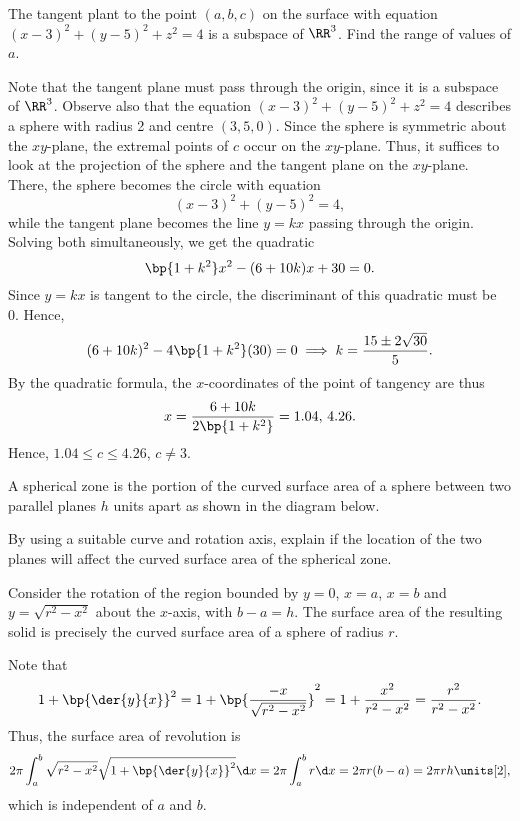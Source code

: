 \begin{problem}
    The tangent plant to the point $(a, b, c)$ on the surface with equation $(x-3)^2 + (y-5)^2 + z^2 = 4$ is a subspace of $\RR^3$. Find the range of values of $a$.
\end{problem}
\begin{solution}
    Note that the tangent plane must pass through the origin, since it is a subspace of $\RR^3$. Observe also that the equation $(x-3)^2 + (y-5)^2 + z^2 = 4$ describes a sphere with radius 2 and centre $(3, 5, 0)$. Since the sphere is symmetric about the $xy$-plane, the extremal points of $c$ occur on the $xy$-plane. Thus, it suffices to look at the projection of the sphere and the tangent plane on the $xy$-plane. There, the sphere becomes the circle with equation \[(x-3)^2 + (y-5)^2 = 4,\] while the tangent plane becomes the line $y = kx$ passing through the origin. Solving both simultaneously, we get the quadratic \[\bp{1 + k^2} x^2 - (6 + 10k)x + 30 = 0.\] Since $y = kx$ is tangent to the circle, the discriminant of this quadratic must be 0. Hence, \[(6 + 10k)^2 - 4\bp{1 + k^2}(30) = 0 \implies k = \frac{15 \pm 2\sqrt{30}}{5}.\] By the quadratic formula, the $x$-coordinates of the point of tangency are thus \[x = \frac{6+10k}{2\bp{1 + k^2}} = 1.04, \, 4.26.\] Hence, $1.04 \leq c \leq 4.26$, $c \neq 3$.
\end{solution}

\clearpage
\begin{problem}
    A spherical zone is the portion of the curved surface area of a sphere between two parallel planes $h$ units apart as shown in the diagram below.

    \begin{figure}[H]
        \centering
    \end{figure}

    By using a suitable curve and rotation axis, explain if the location of the two planes will affect the curved surface area of the spherical zone.
\end{problem}
\begin{solution}
    Consider the rotation of the region bounded by $y = 0$, $x = a$, $x = b$ and $y = \sqrt{r^2 - x^2}$ about the $x$-axis, with $b-a = h$. The surface area of the resulting solid is precisely the curved surface area of a sphere of radius $r$.

    Note that \[1 + \bp{\der{y}{x}}^2 = 1 + \bp{\frac{-x}{\sqrt{r^2-x^2}}}^2 = 1 + \frac{x^2}{r^2 - x^2} = \frac{r^2}{r^2-x^2}.\] Thus, the surface area of revolution is \[2\pi \int_a^b \sqrt{r^2 - x^2} \sqrt{1 + \bp{\der{y}{x}}^2} \d x = 2\pi \int_a^b r \d x = 2\pi r (b-a) = 2\pi r h \units[2],\] which is independent of $a$ and $b$.
\end{solution}

